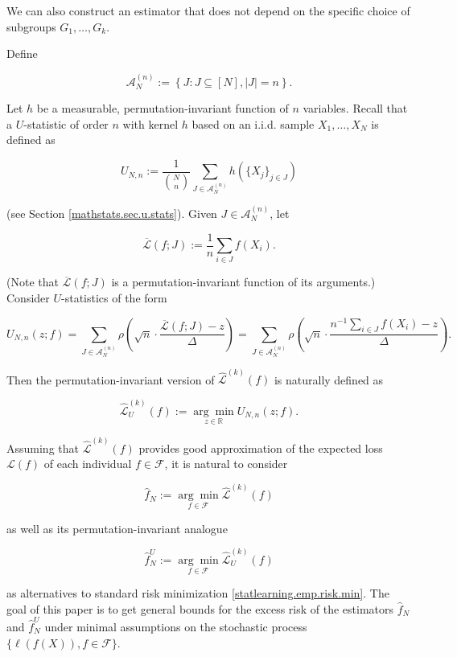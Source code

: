We can also construct an estimator that does not depend on the specific choice of subgroups \(G_1, \ldots, G_k\).

\begin{definition}

Define

\[
\mathcal{A}_N^{(n)} := \left\{ J: J \subseteq [N], |J| = n \right\}.
\]

Let \(h\) be a measurable, permutation-invariant function of \(n\) variables. Recall that a \(U\)-statistic of order \(n\) with kernel \(h\) based on an i.i.d. sample \(X_1,\ldots, X_N\) is defined as 

\[
U_{N, n} := \frac{1}{\binom{N}{n}} \sum_{J \in \mathcal{A}_N^{(n)} } h \left( \{X_j\}_{j \in J} \right)
\]

(see Section \ref{mathstats.sec.u.stats}). Given \(J \in \mathcal{A}_N^{(n)} \), let 

\[
\overline{\mathcal{L}}(f; J) := \frac{1}{n} \sum_{i \in J} f(X_i).
\]

 (Note that \(\overline{\mathcal{L}}(f; J) \) is a permutation-invariant function of its arguments.) Consider \(U\)-statistics of the form

\[
U_{N, n} (z; f) = \sum_{J \in \mathcal{A}_N^{(n)} } \rho\left( \sqrt{n} \cdot \frac{\overline{\mathcal{L}}(f; J)  -z}{\Delta} \right) = \sum_{J \in \mathcal{A}_N^{(n)} } \rho\left( \sqrt{n} \cdot \frac{n^{-1}  \sum_{i \in J} f(X_i)  -z}{\Delta} \right).
\]

Then the permutation-invariant version of \(\hat{\mathcal{L}}^{(k)}(f)\) is naturally defined as

\[
\hat{\mathcal{L}}_U^{(k)}(f) := \underset{z \in \mathbb{R}}{\arg \min} U_{N, n}(z; f).
\]



\end{definition}

Assuming that \(\hat{\mathcal{L}}^{(k)}(f)\) provides good approximation of the expected loss \(\mathcal{L}(f)\) of each individual \(f \in \mathcal{F}\), it is natural to consider 

\[
\hat{f}_N := \underset{f \in \mathcal{F}}{\arg \min} \hat{\mathcal{L}}^{(k)}(f) 
\]

as well as its permutation-invariant analogue

\[
\hat{f}_N^U := \underset{f \in \mathcal{F}}{\arg \min} \hat{\mathcal{L}}_U^{(k)}(f) 
\]

as alternatives to standard risk minimization \eqref{statlearning.emp.risk.min}. The goal of this paper is to get general bounds for the excess risk of the estimators \(\hat{f}_N\) and \(\hat{f}_N^U\) under minimal assumptions on the stochastic process \(\{\ell(f(X)), f \in \mathcal{F}\}\).


